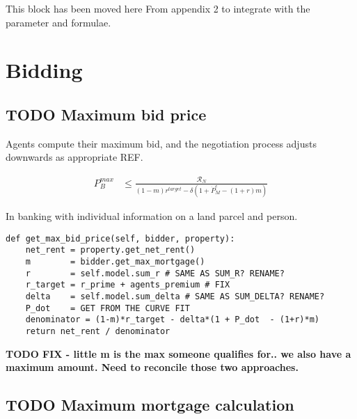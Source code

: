 {\color{red} This block has been moved here From appendix 2 to integrate with the parameter and formulae. 

\section{Bidding}


\subsection{TODO Maximum bid price}

Agents compute their maximum bid, and the negotiation process adjusts downwards as appropriate REF.

\begin{eqnarray}
P_B^{max} & \le    \frac{\mathcal{R}_N}{(1-m)r^{target}-\delta \left(1 + \dot P_M^e - (1+r)m\right)} \label{eqn-bid-price} \end{eqnarray}

In banking with individual information on a land parcel and person.
\begin{lstlisting}
def get_max_bid_price(self, bidder, property):
    net_rent = property.get_net_rent()
    m        = bidder.get_max_mortgage()
    r        = self.model.sum_r # SAME AS SUM_R? RENAME?
    r_target = r_prime + agents_premium # FIX
    delta    = self.model.sum_delta # SAME AS SUM_DELTA? RENAME?
    P_dot    = GET FROM THE CURVE FIT
    denominator = (1-m)*r_target - delta*(1 + P_dot  - (1+r)*m)
    return net_rent / denominator   
\end{lstlisting}

\textbf{TODO FIX - little m is the max someone qualifies for.. we also have a maximum amount. Need to reconcile those two approaches.}
 
\subsection{TODO Maximum mortgage calculation}


}
